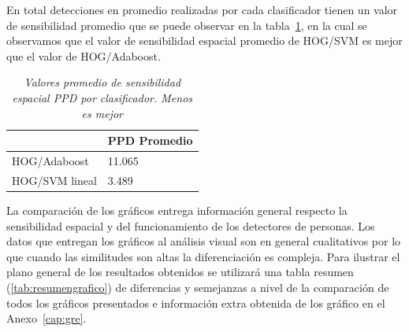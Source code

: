 En total detecciones en promedio realizadas por cada clasificador tienen un valor de sensibilidad promedio que se puede observar en la tabla~\ref{tab:prom1}, en la cual se observamos que el valor de sensibilidad espacial promedio de HOG/SVM es mejor que el valor de HOG/Adaboost.

\begin{table}[h]
\centering
\caption{\em  Valores promedio de sensibilidad espacial PPD por clasificador. Menos es mejor}  
\label{tab:prom1}
\begin{tabular}{l|l|}
\cline{2-2}
                                      & PPD Promedio \\ \hline
\multicolumn{1}{|l|}{HOG/Adaboost}    & 11.065     \\ \hline
\multicolumn{1}{|l|}{HOG/SVM lineal}  & 3.489      \\ \hline
\end{tabular}
\end{table}

La comparación de los gráficos entrega información general respecto la sensibilidad espacial y del funcionamiento de los detectores de personas. Los datos que entregan los gráficos al análisis visual son en general cualitativos por lo que cuando las similitudes son altas la diferenciación es compleja. Para ilustrar el plano general de los resultados obtenidos se utilizará una tabla resumen (\ref{tab:resumengrafico}) de diferencias y semejanzas a nivel de la comparación de todos los gráficos presentados e información extra obtenida de los gráfico en el Anexo~\ref{cap:gre}.

